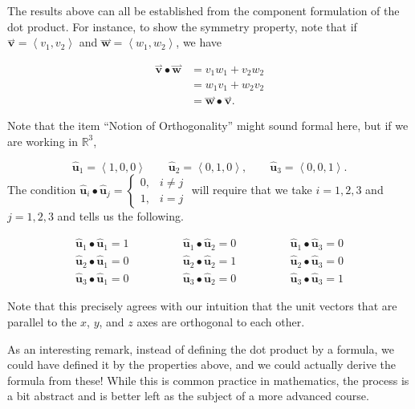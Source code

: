 \documentclass{ximera}
\begin{document}
 The results above can all be established from the component formulation of the dot product.  For instance, to show the symmetry property, note that if $\overset{\boldsymbol{\rightharpoonup}}{\mathbf{v}} = \left< v_1,v_2 \right>$ and $\overset{\boldsymbol{\rightharpoonup}}{\mathbf{w}} = \left< w_1,w_2 \right>$, we have
 
 \begin{align*}
 \overset{\boldsymbol{\rightharpoonup}}{\mathbf{v}} \bullet \overset{\boldsymbol{\rightharpoonup}}{\mathbf{w}} &= v_1w_1+v_2w_2\\
 &= w_1v_1+w_2v_2 \\
 &= \overset{\boldsymbol{\rightharpoonup}}{\mathbf{w}} \bullet \overset{\boldsymbol{\rightharpoonup}}{\mathbf{v}}.
 \end{align*}
 
Note that the item ``Notion of Orthogonality'' might sound formal here, but if we are working in $\mathbb{R}^3$, 


\[
\mathbf{\hat{u}}_1 = \left< 1,0,0 \right> \qquad \mathbf{\hat{u}}_2 = \left< 0,1,0 \right>, \qquad \mathbf{\hat{u}}_3 = \left< 0,0,1 \right>.
\]
The condition $\mathbf{\hat{u}}_i \bullet \mathbf{\hat{u}}_j = \left\{ \begin{array}{ll} 0, & i \neq j \\ 1, & i=j \end{array} \right.$ will require that we take $i=1,2,3$ and $j=1,2,3$ and tells us the following. 

\[
\begin{array}{lll}
\mathbf{\hat{u}}_1 \bullet \mathbf{\hat{u}}_1 = 1 \qquad \qquad & \mathbf{\hat{u}}_1 \bullet \mathbf{\hat{u}}_2 = 0 \qquad \qquad & \mathbf{\hat{u}}_1 \bullet \mathbf{\hat{u}}_3 = 0 \\
\mathbf{\hat{u}}_2 \bullet \mathbf{\hat{u}}_1 = 0 & \mathbf{\hat{u}}_2 \bullet \mathbf{\hat{u}}_2 = 1 & \mathbf{\hat{u}}_2 \bullet \mathbf{\hat{u}}_3 = 0 \\
\mathbf{\hat{u}}_3 \bullet \mathbf{\hat{u}}_1 = 0 & \mathbf{\hat{u}}_3 \bullet \mathbf{\hat{u}}_2 = 0 & \mathbf{\hat{u}}_3 \bullet \mathbf{\hat{u}}_3 = 1
\end{array}
\]

Note that this precisely agrees with our intuition that the unit vectors that are parallel to the $x$, $y$, and $z$ axes are orthogonal to each other.

As an interesting remark, instead of defining the dot product by a formula, we could have
defined it by the properties above, and we could actually derive the formula from these!  While this is common practice in
mathematics, the process is a bit abstract and is better left as the subject of a more advanced course.
\end{document}
